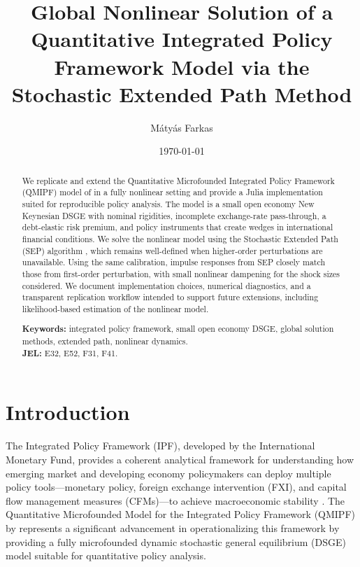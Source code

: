 \documentclass[12pt]{article}
\title{Global Nonlinear Solution of a Quantitative Integrated Policy Framework Model via the Stochastic Extended Path Method}
\author{M\'aty\'as Farkas}
\date{\today}
\begin{document}
\maketitle

\begin{abstract}
\noindent We replicate and extend the Quantitative Microfounded Integrated Policy Framework (QMIPF) model of \citet{adrian2021quantitative} in a fully nonlinear setting and provide a Julia implementation suited for reproducible policy analysis. The model is a small open economy New Keynesian DSGE with nominal rigidities, incomplete exchange-rate pass-through, a debt-elastic risk premium, and policy instruments that create wedges in international financial conditions. We solve the nonlinear model using the Stochastic Extended Path (SEP) algorithm \citep{adjemian2013stochastic,adjemian2025stochastic}, which remains well-defined when higher-order perturbations are unavailable. Using the same calibration, impulse responses from SEP closely match those from first-order perturbation, with small nonlinear dampening for the shock sizes considered. We document implementation choices, numerical diagnostics, and a transparent replication workflow intended to support future extensions, including likelihood-based estimation of the nonlinear model.
\par\medskip
\noindent\textbf{Keywords:} integrated policy framework, small open economy DSGE, global solution methods, extended path, nonlinear dynamics.\\
\noindent\textbf{JEL:} E32, E52, F31, F41.
\end{abstract}



\section{Introduction}

The Integrated Policy Framework (IPF), developed by the International Monetary Fund, provides a coherent analytical framework for understanding how emerging market and developing economy policymakers can deploy multiple policy tools---monetary policy, foreign exchange intervention (FXI), and capital flow management measures (CFMs)---to achieve macroeconomic stability \citep{adrian2020conceptual}. The Quantitative Microfounded Model for the Integrated Policy Framework (QMIPF) by \citet{adrian2021quantitative} represents a significant advancement in operationalizing this framework by providing a fully microfounded dynamic stochastic general equilibrium (DSGE) model suitable for quantitative policy analysis.
\end{document}
